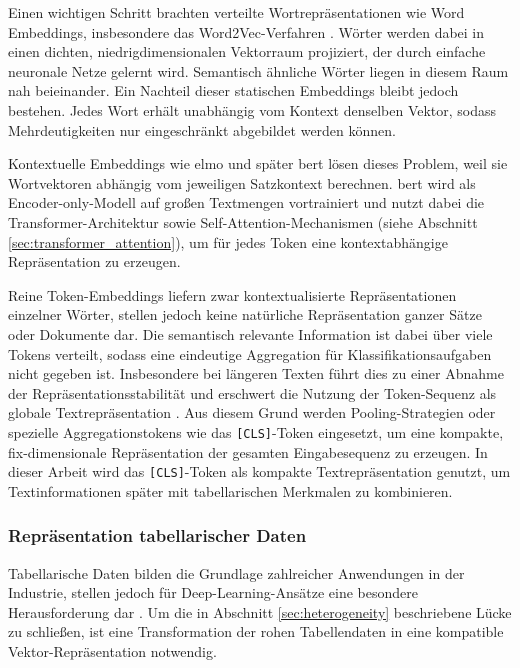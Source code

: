 Einen wichtigen Schritt brachten verteilte Wortrepräsentationen wie Word Embeddings, insbesondere das Word2Vec-Verfahren \cite{Mikolov2013}. Wörter werden dabei in einen dichten, niedrigdimensionalen Vektorraum projiziert, der durch einfache neuronale Netze gelernt wird. Semantisch ähnliche Wörter liegen in diesem Raum nah beieinander. Ein Nachteil dieser statischen Embeddings bleibt jedoch bestehen. Jedes Wort erhält unabhängig vom Kontext denselben Vektor, sodass Mehrdeutigkeiten nur eingeschränkt abgebildet werden können.

Kontextuelle Embeddings wie \Gls{elmo} \cite{Peters2018} und später \Gls{bert} \cite{Devlin2019} lösen dieses Problem, weil sie Wortvektoren abhängig vom jeweiligen Satzkontext berechnen. \gls{bert} wird als Encoder-only-Modell auf großen Textmengen vortrainiert und nutzt dabei die Transformer-Architektur sowie Self-Attention-Mechanismen (siehe Abschnitt \ref{sec:transformer_attention}), um für jedes Token eine kontextabhängige Repräsentation zu erzeugen.

Reine Token-Embeddings liefern zwar kontextualisierte Repräsentationen einzelner Wörter, stellen jedoch keine natürliche Repräsentation ganzer Sätze oder Dokumente dar. Die semantisch relevante Information ist dabei über viele Tokens verteilt, sodass eine eindeutige Aggregation für Klassifikationsaufgaben nicht gegeben ist. Insbesondere bei längeren Texten führt dies zu einer Abnahme der Repräsentationsstabilität und erschwert die Nutzung der Token-Sequenz als globale Textrepräsentation \cite{Devlin2019, Ethayarajh2019}. Aus diesem Grund werden Pooling-Strategien oder spezielle Aggregationstokens wie das \texttt{[CLS]}-Token eingesetzt, um eine kompakte, fix-dimensionale Repräsentation der gesamten Eingabesequenz zu erzeugen. In dieser Arbeit wird das \texttt{[CLS]}-Token als kompakte Textrepräsentation genutzt, um Textinformationen später mit tabellarischen Merkmalen zu kombinieren.

\subsubsection{Repräsentation tabellarischer Daten}
\label{sec:tab_representation}

Tabellarische Daten bilden die Grundlage zahlreicher Anwendungen in der Industrie, stellen jedoch für Deep-Learning-Ansätze eine besondere Herausforderung dar \cite{Borisov2024}. Um die in Abschnitt \ref{sec:heterogeneity} beschriebene Lücke zu schließen, ist eine Transformation der rohen Tabellendaten in eine kompatible Vektor-Repräsentation notwendig.

